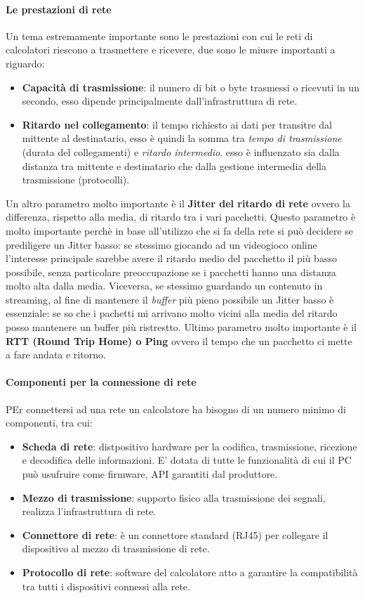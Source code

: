 \documentclass{article}
\begin{document}
\paragraph{Le prestazioni di rete}
Un tema estremamente importante sono le prestazioni con cui le reti di
calcolatori riescono a trasmettere e ricevere, due sono le miusre importanti a
riguardo:
\begin{itemize}
    \item \textbf{Capacità di trasmissione}: il numero di bit o byte trasmessi o ricevuti in un secondo, esso dipende principalmente dall'infrastruttura di rete.
    \item \textbf{Ritardo nel collegamento}: il tempo richiesto ai dati per transitre dal mittente al destinatario, esso è quindi la somma tra \textit{tempo di trasmissione} (durata del collegamenti) e \textit{ritardo intermedio}.
          esso è influenzato sia dalla distanza tra mittente e destinatario che dalla gestione intermedia della trasmissione (protocolli).
\end{itemize}

Un altro parametro molto importante è il \textbf{Jitter del ritardo di rete}
ovvero la differenza, rispetto alla media, di ritardo tra i vari pacchetti.
Questo parametro è molto importante perchè in base all'utilizzo che si fa della
rete si può decidere se prediligere un Jitter basso: se stessimo giocando ad un
videogioco online l'interesse principale sarebbe avere il ritardo medio del
pacchetto il più basso possibile, senza particolare preoccupazione se i
pacchetti hanno una distanza molto alta dalla media. Viceversa, se stessimo
guardando un contenuto in streaming, al fine di mantenere il \textit{buffer}
più pieno possibile un Jitter basso è essenziale: se so che i pachetti mi
arrivano molto vicini alla media del ritardo posso mantenere un buffer più
ristrestto. Ultimo parametro molto importante è il \textbf{RTT (Round Trip
    Home) o Ping} ovvero il tempo che un pacchetto ci mette a fare andata e
ritorno.

\paragraph{Componenti per la connessione di rete}
PEr connettersi ad una rete un calcolatore ha bisogno di un numero minimo di
componenti, tra cui:
\begin{itemize}
    \item \textbf{Scheda di rete}: distpositivo hardware per la codifica, trasmissione, ricezione e decodifica delle informazioni. E' dotata di tutte le funzionalità di cui il PC può usufruire come
          firmware, API garantiti dal produttore.
    \item \textbf{Mezzo di trasmissione}: supporto fisico alla trasmissione dei segnali, realizza l'infrastruttura di rete.
    \item \textbf{Connettore di rete}: è un connettore standard (RJ45) per collegare il dispositivo al mezzo di trasmissione di rete.
    \item \textbf{Protocollo di rete}: software del calcolatore atto a garantire la compatibilità tra tutti i dispositivi connessi alla rete.
\end{itemize}
\end{document}
